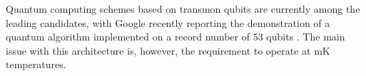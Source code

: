 \documentclass[a4paper,11pt]{article}
\begin{document}
Quantum computing schemes based on transmon qubits are currently among the leading candidates, with Google recently reporting the demonstration of a quantum algorithm implemented on a record number of $53$ qubits \cite{arute_quantum_2019}. The main issue with this architecture is, however, the requirement to operate at mK temperatures.



\end{document}
